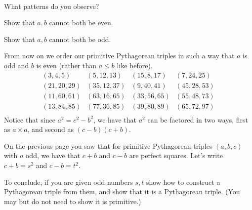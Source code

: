 \documentclass[12pt]{exam}
\begin{document}
\begin{questions}
\begin{equation*}
\begin{array}{llll}
    \end{array}
  \end{equation*}
  \begin{parts}
    \item What patterns do you observe?
    \item Show that $a,b$ cannot both be even.
    \item Show that $a,b$ cannot both be odd.
  \end{parts}
  \newpage
  \question From now on we order our primitive Pythagorean triples in such a way that $a$ is odd and $b$ is even (rather than $a\leq b$ like before).
  \begin{equation*}
    \begin{array}{llll}
      ( 3, 4, 5) & ( 5,12,13) & (15, 8,17) & ( 7,24,25) \\
      (21,20,29) & (35,12,37) & ( 9,40,41) & (45,28,53) \\
      (11,60,61) & (63,16,65) & (33,56,65) & (55,48,73) \\
      (13,84,85) & (77,36,85) & (39,80,89) & (65,72,97) \\
    \end{array}
  \end{equation*}
  Notice that since $a^2=c^2-b^2$, we have that $a^2$ can be factored in two ways, first as $a\times a$, and second as $(c-b)(c+b)$.
  \newpage
  \question On the previous page you saw that for primitive Pythagorean triples $(a,b,c)$ with $a$ odd, we have that $c+b$ and $c-b$ are perfect squares. Let's write $c+b=s^2$ and $c-b=t^2$.
  
  To conclude, if you are given odd numbers $s,t$ show how to construct a Pythagorean triple from them, and show that it is a Pythagorean triple. (You may but do not need to show it is primitive.)
\end{questions}
\end{document}
